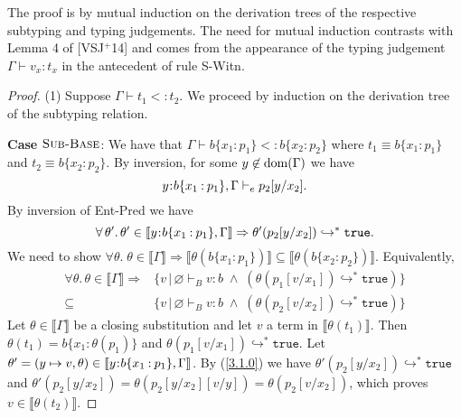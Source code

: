 \documentclass[11pt]{article}
\newcommand{\bind}{\hspace{0.05em}{:}\hspace{0.05em}} %
\newcommand{\col}{\mathbin{:}}       %
\newcommand{\lb}{\llbracket}         %
\newcommand{\rb}{\rrbracket}         %
\newcommand{\many}{\hookrightarrow^*}
\newcommand{\true}{\mathtt{true}}
\newcommand{\dom}[1]{{\rm dom}(#1)}
\begin{document}
The proof is by mutual induction on the derivation trees of the respective subtyping and typing judgements. The need for mutual induction contrasts with Lemma 4 of [VSJ$^+$14] and comes from the appearance of the typing judgement $\Gamma \vdash v_x : t_x $ in the antecedent of rule {\sc S-Witn}.
     
\begin{proof} 
(1) Suppose $\Gamma \vdash t_1 <: t_2$. We proceed by induction on the derivation tree of the subtyping relation.

{\bf Case} $\textsc{Sub-Base}$: We have that 
$\Gamma \vdash b\{x_1\col p_1\} <: b\{x_2\col p_2\}$ where $t_1 \equiv b\{x_1\col p_1\}$ and $t_2 \equiv b\{x_2\col p_2\}$.
By inversion, for some $y\not\in\dom{\Gamma}$ we have  
\[ y\bind b\{x_1\col p_1\}, \Gamma \vdash_e  p_2[y/x_2].\] 
By inversion of {\sc Ent-Pred} we have 
\begin{equation}\label{3.1.0}
\forall\,\theta'.\,\theta'\in\lb y\bind b\{x_1\col p_1\}, \Gamma \rb \Rightarrow \theta'(p_2[y/x_2]) \many \true.
\end{equation}
We need to show $\forall \theta.\; 
\theta \in \lb \Gamma \rb \Rightarrow 
\lb\theta(b\{x_1:p_1\})\rb \subseteq \lb\theta(b\{x_2:p_2\})\rb.$
Equivalently,
\begin{align}\label{3.1.1}
\forall\theta.\,\theta\in\lb\Gamma\rb \Rightarrow&
\{ v \,|\, \varnothing \vdash_B v:b \;\wedge\; 
  (\theta(p_1[v/x_1]) \many \true)\}\\
\subseteq &\{ v \,|\, \varnothing \vdash_B v:b \;\wedge\; 
  (\theta(p_2[v/x_2]) \many \true)\}\label{3.1.2}
\end{align}
Let $\theta \in \lb\Gamma\rb$ be a closing substitution and
let $v$ a term in $\lb\theta(t_1)\rb$. 
Then $\theta(t_1) = b\{x_1\col \theta(p_1)\}$ and $\theta(p_1[v/x_1]) \many \true$.
Let $\theta' = (y \mapsto v, \theta) \in \lb y\bind b\{ x_1\col p_1\}, \Gamma\rb$.
By (\ref{3.1.0}) we have
$ \theta'(p_2[y/x_2]) \many \true$ and $\theta'(p_2[y/x_2]) = \theta(p_2[y/x_2][v/y]) = \theta(p_2[v/x_2])$,
which proves $v \in \lb\theta(t_2)\rb$.


\end{proof}
\end{document}
